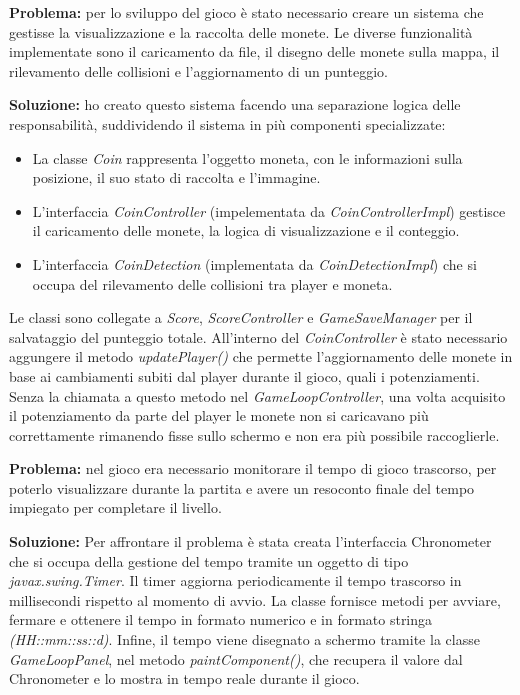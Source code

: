\documentclass[a4paper,12pt]{report}
\begin{document}
\newpage
\textbf{Problema:} per lo sviluppo del gioco è stato necessario creare un sistema che gestisse la visualizzazione e la raccolta delle monete.
Le diverse funzionalità implementate sono il caricamento da file, il disegno delle monete sulla mappa, il rilevamento delle collisioni e 
l'aggiornamento di un punteggio.

\textbf{Soluzione:} ho creato questo sistema facendo una separazione logica delle responsabilità, suddividendo il sistema in più componenti
specializzate:
\begin{itemize}
    \item La classe \emph{Coin} rappresenta l'oggetto moneta, con le informazioni sulla posizione, il suo stato di raccolta e l'immagine.
    \item L'interfaccia \emph{CoinController} (impelementata da \emph{CoinControllerImpl}) gestisce il caricamento delle monete, la logica di 
    visualizzazione e il conteggio.
    \item L'interfaccia \emph{CoinDetection} (implementata da \emph{CoinDetectionImpl}) che si occupa del rilevamento delle collisioni tra player 
    e moneta.
\end{itemize}
Le classi sono collegate a \emph{Score}, \emph{ScoreController} e \emph{GameSaveManager} per il salvataggio del punteggio totale.
All'interno del \emph{CoinController} è stato necessario aggungere il metodo \emph{updatePlayer()} che permette l'aggiornamento delle monete 
in base ai cambiamenti subiti dal player durante il gioco, quali i potenziamenti. Senza la chiamata a questo metodo nel \emph{GameLoopController}, 
una volta acquisito il potenziamento da parte del player le monete non si caricavano più correttamente rimanendo fisse sullo schermo e non era più
possibile raccoglierle.

\textbf{Problema:} nel gioco era necessario monitorare il tempo di gioco trascorso, per poterlo visualizzare durante la partita e avere un 
resoconto finale del tempo impiegato per completare il livello.

\textbf{Soluzione:} Per affrontare il problema è stata creata l'interfaccia Chronometer che si occupa della gestione del tempo tramite un 
oggetto di tipo \emph{javax.swing.Timer}. Il timer aggiorna periodicamente il tempo trascorso in millisecondi rispetto al momento di avvio. La
classe fornisce metodi per avviare, fermare e ottenere il tempo in formato numerico e in formato stringa \emph{(HH::mm::ss::d)}. Infine, il tempo 
viene disegnato a schermo tramite la classe \emph{GameLoopPanel}, nel metodo \emph{paintComponent()}, che recupera il valore dal Chronometer e lo 
mostra in tempo reale durante il gioco.
\end{document}
